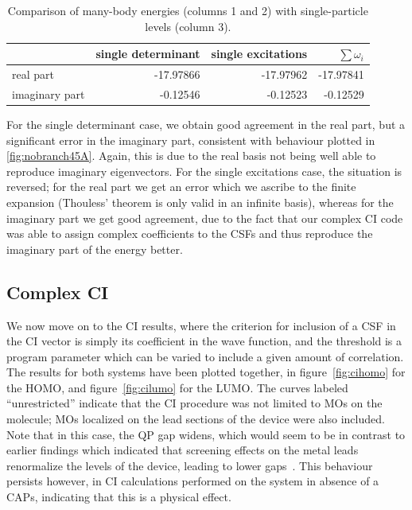 \begin{table}
  \centering
  \begin{tabular}{l r r r} 
    \hline
                 & single determinant & single excitations & $\sum \omega_i$ \\
    \hline
    real part      & -17.97866 & -17.97962 & -17.97841\\
    imaginary part & -0.12546 & -0.12523 & -0.12529\\
    \hline
  \end{tabular}
  \caption{Comparison of many-body energies (columns 1 and 2) with
           single-particle levels (column 3).}
  \label{tab:eesum}
\end{table}

For the single determinant case, we obtain good agreement in the real part, but
a significant error in the imaginary part, consistent with behaviour plotted in
\ref{fig:nobranch45A}. Again, this is due to the real basis not being well able
to reproduce imaginary eigenvectors. For the single excitations case, the
situation is reversed; for the real part we get an error which we ascribe to
the finite expansion (Thouless' theorem is only valid in an infinite basis),
whereas for the imaginary part we get good agreement, due to the fact that our
complex \ac{CI} code was able to assign complex coefficients to the \acp{CSF}
and thus reproduce the imaginary part of the energy better.

\subsection{Complex \ac{CI}}

We now move on to the \ac{CI} results, where the criterion for inclusion of a
\ac{CSF} in the \ac{CI} vector is simply its coefficient in the wave function,
and the threshold is a program parameter which can be varied to include a given
amount of correlation. The results for both systems have been plotted together,
in figure~\ref{fig:cihomo} for the \ac{HOMO}, and figure~\ref{fig:cilumo}
for the \ac{LUMO}. The curves labeled ``unrestricted'' indicate that the \ac{CI}
procedure was not limited to MOs on the molecule; MOs localized on the lead
sections of the device were also included. Note that in this case, the QP gap
widens, which would seem to be in contrast to earlier findings which indicated
that screening effects on the metal leads renormalize the levels of the device,
leading to lower gaps~\cite{thygesen_rubio, thygesen}. This behaviour persists
however, in \ac{CI} calculations performed on the system in absence of a
\acp{CAP}, indicating that this is a physical effect.

